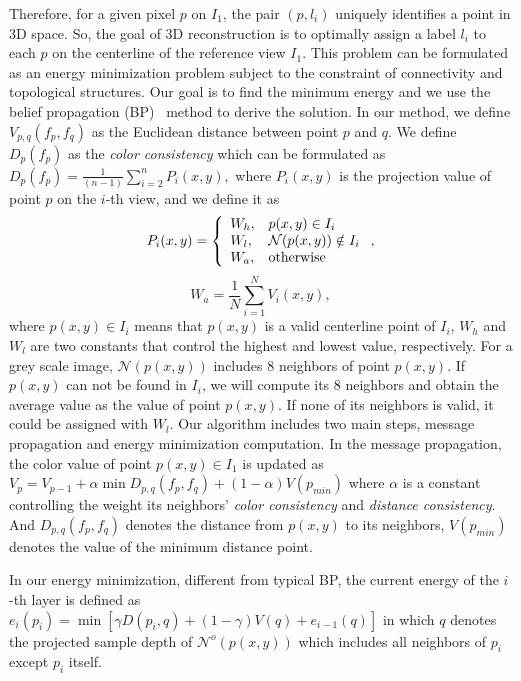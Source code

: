 \documentclass[10pt, conference, compsocconf]{IEEEtran}
\begin{document}
Therefore, for a given pixel $p$ on $I_{1}$, the pair $(p, l_{i})$ uniquely
identifies a point in 3D space. So, the goal of 3D reconstruction is to
optimally assign a label $l_{i}$ to each $p$ on the centerline of the
reference view $I_{1}$. This problem can be formulated as an energy
minimization problem subject to the constraint of connectivity and
topological structures. Our goal is to find the minimum energy and we use
the belief propagation (BP)~\cite{felzenszwalb2006efficient} method to
derive the solution. In our method, we define $V_{p,q}(f_{p}, f_{q})$ as the
Euclidean distance between point $p$ and $q$. We define $D_{p}(f_{p})$ as
the \emph{color consistency} which can be formulated as $D_{p}(f_{p}) =
\frac{1}{(n-1)} \sum_{i=2}^{n} P_{i}(x,y),$ where $P_{i}(x,y)$ is the
projection value of point $p$ on the $i$-th view, and we define it as
\begin{equation}
P_{i}(x,y) =
\left\{
  \begin{array}{lll}
    W_{h}, & \hbox {$p(x,y) \in I_{i}$} \\
    W_{l},  & \hbox {$ \mathcal{N}(p(x,y)) \notin I_{i}$} \\
    W_{a}, & \hbox {otherwise}
  \end{array}
\right.,
\end{equation}
\begin{equation}
W_{a} = \frac{1}{N} \sum_{i=1}^{N} V_{i}(x,y),
\end{equation}
where $p(x,y)\in I_{i}$ means that $p(x,y)$ is a valid centerline point of
$I_{i}$, $W_{h}$ and $W_{l}$ are two constants that control the highest and
lowest value, respectively. For a grey scale image, $\mathcal{N}(p(x,y))$
includes 8 neighbors of point $p(x,y)$. If $p(x,y)$ can not be found in
$I_{i}$, we will compute its 8 neighbors and obtain the average value as the
value of point $p(x,y)$. If none of its neighbors is valid, it could be
assigned with $ W_{l}$. Our algorithm includes two main steps, message
propagation and energy minimization computation. In the message propagation,
the color value of point $p(x,y) \in I_{1}$ is updated as $ V_{p} = V_{p-1}
+ \alpha \min D_{p,q}(f_p, f_q)+ (1-\alpha)V(p_{min})$ where $\alpha$ is a
constant controlling the weight its neighbors' \emph{color
  consistency} and \emph{distance consistency}. And $D_{p,q}(f_p, f_q)$
denotes the distance from $p(x,y)$ to its neighbors, $V(p_{min})$ denotes
the value of the minimum distance point.

In our energy minimization, different from typical BP, the current energy of
the $i$-th layer is defined as $e_{i}(p_{i}) = \min[\gamma D(p_{i}, q) +
(1-\gamma)V(q) + e_{i-1}(q)]$ in which $q$ denotes the projected sample
depth of $\mathcal{N}^o(p(x,y))$ which includes all neighbors of $p_{i}$
except $p_{i}$ itself.
\end{document}
